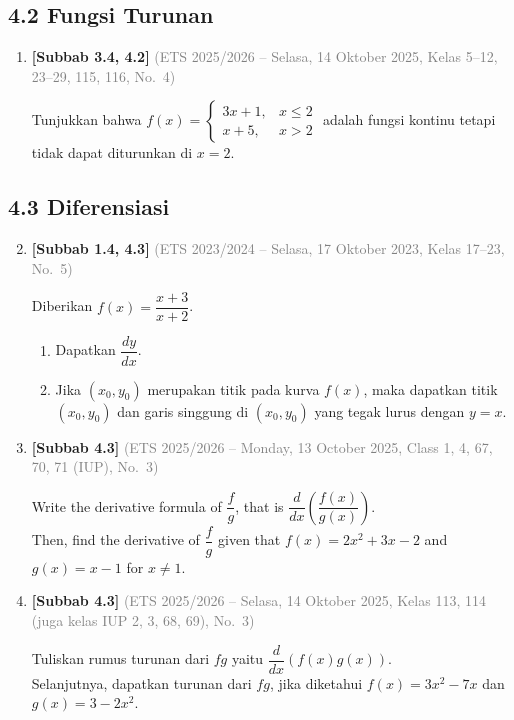 \documentclass[10pt,openany,a4paper]{article}
\theoremstyle{definition}
\theoremstyle{definition}
\theoremstyle{plain}
\begin{document}
\subsection*{4.2 \quad Fungsi Turunan}
\begin{enumerate}
\setcounter{enumi}{0}
    \item \textbf{[Subbab 3.4, 4.2]} {\footnotesize\textcolor{gray}{(ETS 2025/2026 -- Selasa, 14 Oktober 2025, Kelas 5--12, 23--29, 115, 116, No.~4)}}\par
    Tunjukkan bahwa $f(x)=\begin{cases}
        3x+1, &x\leq 2\\
        x+5, &x>2
    \end{cases}$ adalah fungsi kontinu tetapi tidak dapat diturunkan di $x=2$.

\end{enumerate}
\subsection*{4.3 \quad Diferensiasi}
\begin{enumerate}
\setcounter{enumi}{1}
    \item \textbf{[Subbab 1.4, 4.3]} {\footnotesize\textcolor{gray}{(ETS 2023/2024 -- Selasa, 17 Oktober 2023, Kelas 17--23, No.~5)}}\par
    Diberikan $f(x)=\dfrac{x+3}{x+2}$.
    \begin{enumerate}
        \item Dapatkan $\dfrac{dy}{dx}$.
        \item Jika $(x_0,y_0)$ merupakan titik pada kurva $f(x)$, maka dapatkan titik $(x_0,y_0)$ dan garis singgung di $(x_0,y_0)$ yang tegak lurus dengan $y=x$.
    \end{enumerate}

    \item \textbf{[Subbab 4.3]} {\footnotesize\textcolor{gray}{(ETS 2025/2026 -- Monday, 13 October 2025, Class 1, 4, 67, 70, 71 (IUP), No.~3)}}\par
    Write the derivative formula of $\dfrac{f}{g}$, that is $\dfrac{d}{dx}\left(\dfrac{f(x)}{g(x)}\right)$. \\
    Then, find the derivative of $\dfrac{f}{g}$ given that $f(x) = 2x^2 + 3x - 2$ and $g(x) = x - 1$ for $x \neq 1$.

    \item \textbf{[Subbab 4.3]} {\footnotesize\textcolor{gray}{(ETS 2025/2026 -- Selasa, 14 Oktober 2025, Kelas 113, 114 (juga kelas IUP 2, 3, 68, 69), No.~3)}}\par
    Tuliskan rumus turunan dari $fg$ yaitu $\dfrac{d}{dx}(f(x)g(x))$.\\
    Selanjutnya, dapatkan turunan dari $fg$, jika diketahui $f(x)=3x^2-7x$ dan $g(x)=3-2x^2$.

\end{enumerate}
\end{document}
